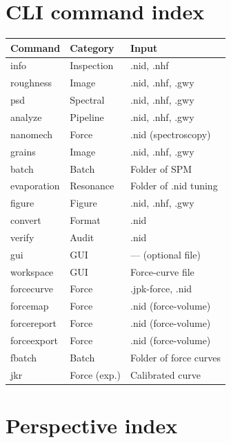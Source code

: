 \documentclass[a4paper,11pt]{article}
\begin{document}
\section{CLI command index}

\begin{longtable}{@{}>{\ttfamily}l l l@{}}
\toprule
Command & Category & Input \\
\midrule
info & Inspection & .nid, .nhf \\
roughness & Image & .nid, .nhf, .gwy \\
psd & Spectral & .nid, .nhf, .gwy \\
analyze & Pipeline & .nid, .nhf, .gwy \\
nanomech & Force & .nid (spectroscopy) \\
grains & Image & .nid, .nhf, .gwy \\
batch & Batch & Folder of SPM \\
evaporation & Resonance & Folder of .nid tuning \\
figure & Figure & .nid, .nhf, .gwy \\
convert & Format & .nid \\
verify & Audit & .nid \\
gui & GUI & --- (optional file) \\
workspace & GUI & Force-curve file \\
forcecurve & Force & .jpk-force, .nid \\
forcemap & Force & .nid (force-volume) \\
forcereport & Force & .nid (force-volume) \\
forceexport & Force & .nid (force-volume) \\
fbatch & Batch & Folder of force curves \\
jkr & Force (exp.) & Calibrated curve \\
\bottomrule
\end{longtable}

\section{Perspective index}
\end{document}
